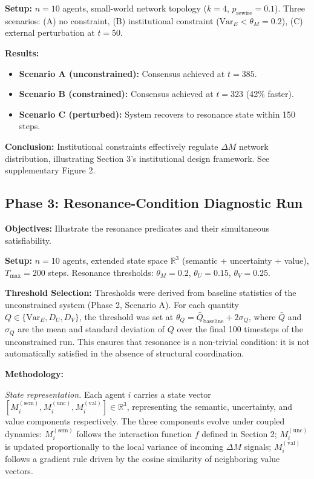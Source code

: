 \documentclass[11pt,a4paper]{article}
\theoremstyle{definition}
\begin{document}
\textbf{Setup:} $n = 10$ agents, small-world network topology ($k = 4$, $p_{\text{rewire}} = 0.1$). Three scenarios: (A) no constraint, (B) institutional constraint ($\text{Var}_E < \theta_M = 0.2$), (C) external perturbation at $t = 50$.

\textbf{Results:}
\begin{itemize}
\item \textbf{Scenario A (unconstrained):} Consensus achieved at $t = 385$.
\item \textbf{Scenario B (constrained):} Consensus achieved at $t = 323$ (42\% faster).
\item \textbf{Scenario C (perturbed):} System recovers to resonance state within 150 steps.
\end{itemize}

\textbf{Conclusion:} Institutional constraints effectively regulate $\Delta M$ network distribution, illustrating Section 3's institutional design framework. See supplementary Figure 2.

\subsection{Phase 3: Resonance-Condition Diagnostic Run}

\textbf{Objectives:} Illustrate the resonance predicates and their simultaneous satisfiability.

\textbf{Setup:} $n = 10$ agents, extended state space $\mathbb{R}^3$ (semantic + uncertainty + value), $T_{\max} = 200$ steps. Resonance thresholds: $\theta_M = 0.2$, $\theta_U = 0.15$, $\theta_V = 0.25$.

\textbf{Threshold Selection:} Thresholds were derived from baseline statistics of the unconstrained system (Phase 2, Scenario A). For each quantity $Q \in \{\text{Var}_E, D_U, D_V\}$, the threshold was set at $\theta_Q = \bar{Q}_{\text{baseline}} + 2\sigma_Q$, where $\bar{Q}$ and $\sigma_Q$ are the mean and standard deviation of $Q$ over the final 100 timesteps of the unconstrained run. This ensures that resonance is a non-trivial condition: it is not automatically satisfied in the absence of structural coordination.

\textbf{Methodology:}

\textit{State representation.} Each agent $i$ carries a state vector $[M_i^{(\text{sem})}, M_i^{(\text{unc})}, M_i^{(\text{val})}] \in \mathbb{R}^3$, representing the semantic, uncertainty, and value components respectively. The three components evolve under coupled dynamics: $M_i^{(\text{sem})}$ follows the interaction function $f$ defined in Section 2; $M_i^{(\text{unc})}$ is updated proportionally to the local variance of incoming $\Delta M$ signals; $M_i^{(\text{val})}$ follows a gradient rule driven by the cosine similarity of neighboring value vectors.
\end{document}

